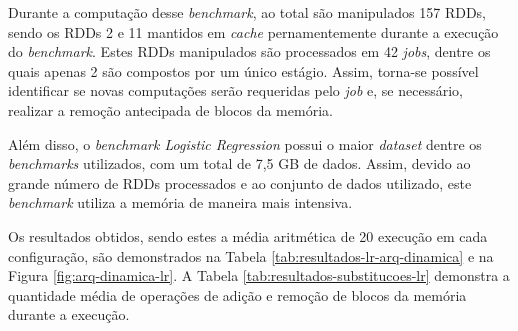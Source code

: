 Durante a computação desse \textit{benchmark}, ao total são manipulados 157 RDDs, sendo os RDDs 2 e 11 mantidos em \textit{cache} pernamentemente durante a execução do \textit{benchmark}. Estes RDDs manipulados são processados em 42 \textit{jobs}, dentre os quais apenas 2 são compostos por um único estágio. Assim, torna-se possível identificar se novas computações serão requeridas pelo \textit{job} e, se necessário, realizar a remoção antecipada de blocos da memória.

Além disso, o \textit{benchmark Logistic Regression} possui o maior \textit{dataset} dentre os \textit{benchmarks} utilizados, com um total de 7,5 GB de dados. Assim, devido ao grande número de RDDs processados e ao conjunto de dados utilizado, este \textit{benchmark} utiliza a memória de maneira mais intensiva.

Os resultados obtidos, sendo estes a média aritmética de 20 execução em cada configuração, são demonstrados na Tabela \ref{tab:resultados-lr-arq-dinamica} e na Figura \ref{fig:arq-dinamica-lr}. A Tabela \ref{tab:resultados-substitucoes-lr} demonstra a quantidade média de operações de adição e remoção de blocos da memória durante a execução.

\begin{table}[!ht]
    \caption{Tempos de Execuções Obtidos no \textit{Benchmark} \textit{Logistic Regression}}
    \label{tab:resultados-lr-arq-dinamica}
    \centering
\end{table}

